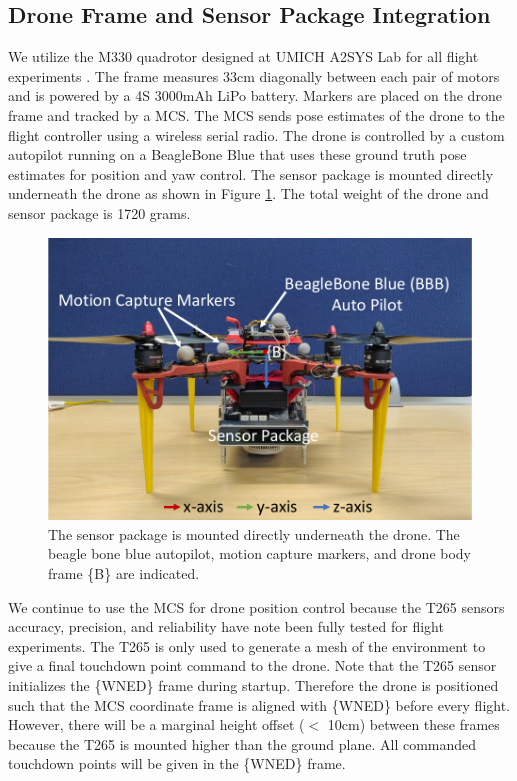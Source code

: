 \subsection{Drone Frame and Sensor Package Integration}

We utilize the M330 quadrotor designed at UMICH A2SYS Lab for all flight experiments \cite{romano_experimental_2019}. The frame measures 33cm diagonally between each pair of motors and is powered by a 4S 3000mAh LiPo battery. Markers are placed on the drone frame and tracked by a \ac{MCS}. The \ac{MCS} sends pose estimates of the drone to the flight controller using a wireless serial radio. The drone is controlled by a custom autopilot running on a BeagleBone Blue that uses these ground truth pose estimates for position and yaw control. The sensor package is mounted directly underneath the drone as shown in Figure \ref{fig:ch7_drone_frame}. The total weight of the drone and sensor package is 1720 grams.

\begin{figure}[!htb]
  \centering
  \includegraphics[page=1,clip,trim=0cm 0cm 0cm 0cm,width=.50\linewidth]{chapter_7_experiments/imgs/drone_with_sensor_package.pdf}
  \caption[Sensor package mounted underneath drone]{The sensor package is mounted directly underneath the drone. The beagle bone blue autopilot, motion capture markers, and drone body frame \{B\} are indicated.}\label{fig:ch7_drone_frame}
\end{figure}

We continue to use the \ac{MCS} for drone position control because the T265 sensors accuracy, precision, and reliability have note been fully tested for flight experiments. The T265 is only used to generate a mesh of the environment to give a final touchdown point command to the drone. Note that the T265 sensor initializes the \{WNED\} frame during startup. Therefore the drone is positioned such that the \ac{MCS} coordinate frame is aligned with \{WNED\} before every flight. However, there will be a marginal height offset ($<$ 10cm) between these frames because the T265 is mounted higher than the ground plane. All commanded touchdown points will be given in the \{WNED\} frame.

